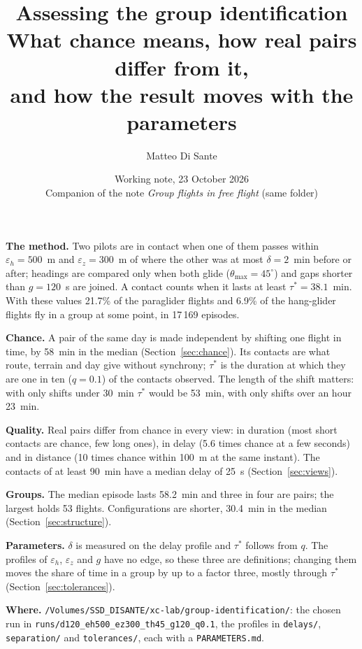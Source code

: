 \documentclass[11pt,a4paper]{article}
\title{\textbf{Assessing the group identification}\\[4pt]
  \large What chance means, how real pairs differ from it,\\
  and how the result moves with the parameters}
\author{Matteo Di Sante}
\date{Working note, 23 October 2026\\[2pt]
  \small Companion of the note \emph{Group flights in free flight} (same folder)}
\begin{document}
\maketitle

\begin{summary}
\textbf{The method.} Two pilots are in contact when one of them passes within
$\varepsilon_h=500$~m and $\varepsilon_z=300$~m of where the other was at most
$\delta=2$~min before or after; headings are compared only when both glide
($\theta_{\max}=45^\circ$) and gaps shorter than $g=120$~s are joined. A contact counts
when it lasts at least $\tau^*=38.1$~min. With these values 21.7\% of the paraglider flights and
6.9\% of the hang-glider flights fly in a group at some point, in 17\,169 episodes.

\textbf{Chance.} A pair of the same day is made independent by shifting one flight in time,
by 58~min in the median (Section~\ref{sec:chance}). Its contacts are what route, terrain and
day give without synchrony; $\tau^*$ is the duration at which they are one in ten ($q=0.1$) of
the contacts observed. The length of the shift matters: with only shifts under 30~min
$\tau^*$ would be 53~min, with only shifts over an hour 23~min.

\textbf{Quality.} Real pairs differ from chance in every view: in duration (most short
contacts are chance, few long ones), in delay (5.6 times chance at a few seconds) and in
distance (10 times chance within 100~m at the same instant). The contacts of at least 90~min
have a median delay of 25~s (Section~\ref{sec:views}).

\textbf{Groups.} The median episode lasts 58.2~min and three in four are pairs; the largest
holds 53 flights. Configurations are shorter, 30.4~min in the median
(Section~\ref{sec:structure}).

\textbf{Parameters.} $\delta$ is measured on the delay profile and $\tau^*$ follows from $q$.
The profiles of $\varepsilon_h$, $\varepsilon_z$ and $g$ have no edge, so these three are
definitions; changing them moves the share of time in a group by up to a factor three, mostly
through $\tau^*$ (Section~\ref{sec:tolerances}).

\textbf{Where.} \nolinkurl{/Volumes/SSD_DISANTE/xc-lab/group-identification/}: the chosen run in
\nolinkurl{runs/d120_eh500_ez300_th45_g120_q0.1}, the profiles in \nolinkurl{delays/},
\nolinkurl{separation/} and \nolinkurl{tolerances/}, each with a \texttt{PARAMETERS.md}.
\end{summary}
\end{document}
